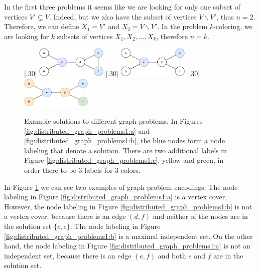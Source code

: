 In the first three problems it seems like we are looking for only one subset of vertices $V' \subseteq V$.
Indeed, but we also have the subset of vertices $V \backslash V'$, thus $n=2$.
Therefore, we can define $X_1 = V'$ and $X_2 = V \backslash V'$.
In the problem $k$-coloring, we are looking for $k$ subsets of vertices $X_1, X_2, \dotsc, X_k$, therefore $n=k$.

\begin{figure}[H]
    [.30\linewidth] {
    \centering
    \includegraphics[width=0.30\textwidth]{diagrams/formalizing_pn_network_6.pdf}
  }
  \hfill
    [.30\linewidth] {
    \centering
    \includegraphics[width=0.30\textwidth]{diagrams/formalizing_pn_network_7.pdf}
  }
  \hfill
    [.30\linewidth] {
    \centering
    \includegraphics[width=0.30\textwidth]{diagrams/formalizing_pn_network_8.pdf}
  }
  \caption{Example solutions to different graph problems.
  In Figures \ref{fig:distributed_graph_problems1:a} and \ref{fig:distributed_graph_problems1:b}, the blue nodes form a node labeling that denote a solution.
  There are two additional labels in Figure \ref{fig:distributed_graph_problems1:c}, yellow and green, in order there to be 3 labels for 3 colors.
  }
  \label{fig:distributed_graph_problems1}
\end{figure}

In Figure \ref{fig:distributed_graph_problems1} we can see two examples of graph problem encodings.
The node labeling in Figure \ref{fig:distributed_graph_problems1:a} is a vertex cover.
However, the node labeling in Figure \ref{fig:distributed_graph_problems1:b} is not a vertex cover, because there is an edge $(d, f)$ and neither of the nodes are in the solution set $\{c, e\}$.
The node labeling in Figure \ref{fig:distributed_graph_problems1:b} is a maximal independent set.
On the other hand, the node labeling in Figure \ref{fig:distributed_graph_problems1:a} is not an independent set, because there is an edge $(e, f)$ and both $e$ and $f$ are in the solution set.



